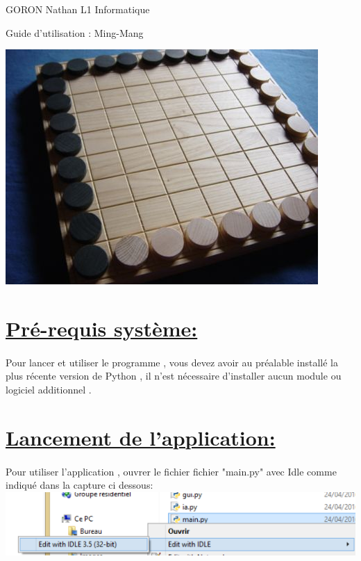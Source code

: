 \documentclass[a4paper,12pt]{article}
\begin{document}
\begin{flushleft}
GORON Nathan
\newline
L1 Informatique
\vspace{1cm}
\end{flushleft}
\begin{center}
\begin{Huge}{Guide d'utilisation : Ming-Mang}
\end{Huge}
\newline
\newline
\newline
\newline
\newline
\newline
\includegraphics[scale=0.5]{images/mingmang.jpg}
\end{center}

\newpage

\section{\underline{Pré-requis système:}}
\paragraph{}
Pour lancer et utiliser le programme , vous devez avoir au préalable installé
la plus récente version de Python , il n'est nécessaire d'installer aucun module ou logiciel
additionnel .

\section{\underline{Lancement de l'application:}}
\paragraph{}
Pour utiliser l'application , ouvrer le fichier fichier "main.py" avec Idle comme
indiqué dans la capture ci dessous:
\newline
\includegraphics[scale=1]{images/lancement.png}
\newline
\end{document}
